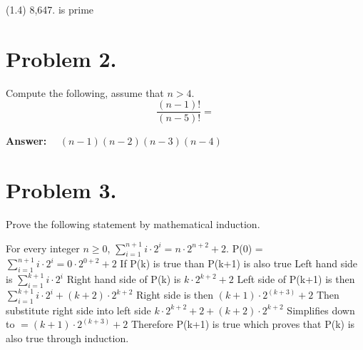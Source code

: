 \documentclass[11pt]{article}
\begin{document}
\noindent
(1.4) 8,647.
\newline
{} is prime


\section*{Problem 2.}

\noindent
Compute the following, assume that $n>4$.
$$\frac{(n-1)!}{(n-5)!} = $$ 

{\bf Answer:}~~ $(n-1)(n-2)(n-3)(n-4)$
\newpage

\section*{Problem 3.}

Prove the following statement by mathematical induction.

For every integer $n\geq 0$, $\sum\limits_{i=1}^{n+1}i\cdot 2^i=n\cdot 2^{n+2}+2$.
\newline
\newline
P(0) =  $\sum\limits_{i=1}^{n+1}i\cdot 2^i=0\cdot 2^{0+2}+2$
\newline
If P(k) is true than P(k+1) is also true
\newline
Left hand side is $\sum\limits_{i=1}^{k+1} i\cdot  2^i$
\newline
Right hand side of P(k) is $k \cdot 2^{k+2} + 2$
\newline
\newline
Left side of P(k+1) is then $\sum\limits_{i=1}^{k+1} i \cdot 2^i + (k+2)\cdot2^{k+2}$
\newline
\newline
Right side is then $(k+1)\cdot 2^{(k+3)}+2$
\newline
\newline
Then substitute right side into left side
\newline
\newline
$k\cdot 2^{k+2}+2 + (k+2)\cdot 2^{k+2}$
\newline
\newline
Simplifies down to
\newline
\newline
$=(k+1)\cdot 2^{(k+3)}+2$
\newline
\newline
Therefore P(k+1) is true which proves that P(k) is also true through induction.


\end{document}
